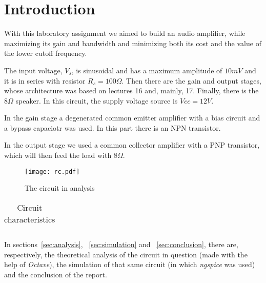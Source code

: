 \section{Introduction}
\label {sec:introduction}


With this laboratory assignment we aimed to build an audio amplifier, while maximizing its gain and bandwidth and minimizing both its cost and the value of the lower cutoff frequency.

The input voltage, $V_s$, is sinusoidal and has a maximum amplitude of $10 mV$ and it is in series with resistor $R_s=100 \Omega$. Then there are the gain and output stages, whose architecture was based on lectures 16 and, mainly, 17. Finally, there is the $8 \Omega$ speaker. In this circuit, the supply voltage source is $Vcc=12 V$.

In the gain stage a degenerated common emitter amplifier with a bias circuit and a bypass capaciotr was used. In this part there is an NPN transistor.

In the output stage we used a common collector amplifier with a PNP transistor, which will then feed the load with $8 \Omega$.



\begin{figure}[H] \centering
\texttt{[image: rc.pdf]}
\caption{The circuit in analysis}
\label{fig:circuit}
\end{figure}

\begin{table}[H]
  \centering
  \begin{tabular}{|c|c|}
    \hline
      
  \end{tabular}
  \caption{Circuit characteristics}
  \label{tab:resistance}
\end{table}

In sections~\ref{sec:analysis}, ~\ref{sec:simulation} and ~\ref{sec:conclusion}, there are, respectively, the theoretical analysis of the circuit in question (made with the help of \textit{Octave}), the simulation of that same circuit (in which \textit{ngspice} was used) and the conclusion of the report.
